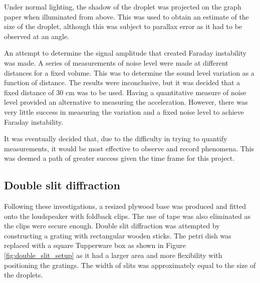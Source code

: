 Under normal lighting, the shadow of the droplet was projected on the graph paper when illuminated from above. This was used to obtain an estimate of the size of the droplet, although this was subject to parallax error as it had to be observed at an angle.

An attempt to determine the signal amplitude that created Faraday instability was made. A series of measurements of noise level were made at different distances for a fixed volume. This was to determine the sound level variation as a function of distance. The results were inconclusive, but it was decided that a fixed distance of 30 cm was to be used. Having a quantitative measure of noise level provided an alternative to measuring the acceleration. However, there was very little success in measuring the variation and a fixed noise level to achieve Faraday instability.

It was eventually decided that, due to the difficulty in trying to quantify measurements, it would be most effective to observe and record phenomena. This was deemed a path of greater success given the time frame for this project.

\subsection{Double slit diffraction}
Following these investigations, a resized plywood base was produced and fitted onto the loudspeaker with foldback clips. The use of tape was also eliminated as the clips were secure enough. Double slit diffraction was attempted by constructing a grating with rectangular wooden sticks. The petri dish was replaced with a square Tupperware box as shown in Figure \ref{fig:double_slit_setup} as it had a larger area and more flexibility with positioning the gratings. The width of slits was approximately equal to the size of the droplets.

